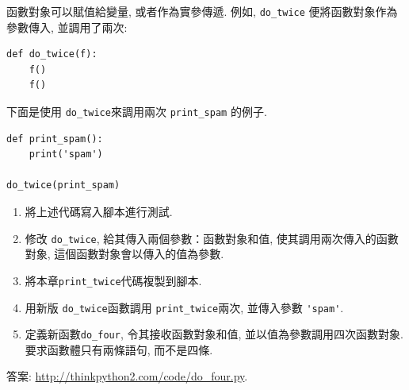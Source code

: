 \documentclass[10pt]{book}
\begin{document}
\begin{exercise}

函數對象可以賦值給變量, 或者作為實參傳遞. 
例如, \verb"do_twice" 便將函數對象作為參數傳入, 並調用了兩次:

\begin{verbatim}
def do_twice(f):
    f()
    f()
\end{verbatim}

下面是使用 \verb"do_twice"來調用兩次 \verb"print_spam" 的例子. 

\begin{verbatim}
def print_spam():
    print('spam')

do_twice(print_spam)
\end{verbatim}

\begin{enumerate}

\item 將上述代碼寫入腳本進行測試.

\item 修改 \verb"do_twice", 給其傳入兩個參數：函數對象和值, 
使其調用兩次傳入的函數對象, 這個函數對象會以傳入的值為參數.

\item 將本章\verb"print_twice"代碼複製到腳本.

\item 用新版 \verb"do_twice"函數調用 \verb"print_twice"兩次, 
並傳入參數 \verb"'spam'".

\item 定義新函數\verb"do_four", 令其接收函數對象和值, 
並以值為參數調用四次函數對象. 
要求函數體只有兩條語句, 而不是四條. 

\end{enumerate}

答案: \url{http://thinkpython2.com/code/do_four.py}.

\end{exercise}
\end{document}
